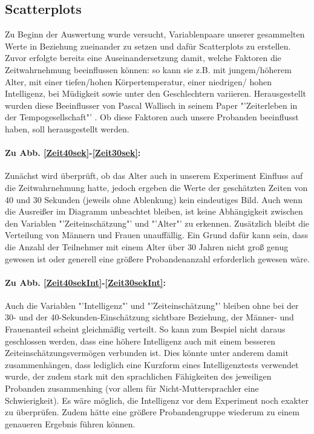\documentclass{Paper}
\begin{document}
\subsection{Scatterplots}
Zu Beginn der Auswertung wurde versucht, Variablenpaare unserer gesammelten Werte in Beziehung zueinander zu setzen und dafür Scatterplots zu erstellen. Zuvor erfolgte bereits eine Auseinandersetzung damit, welche Faktoren die Zeitwahrnehmung beeinflussen können: so kann sie z.B. mit jungem/höherem Alter, mit einer tiefen/hohen Körpertemperatur, einer niedrigen/ hohen Intelligenz, bei Müdigkeit sowie unter den Geschlechtern variieren. Herausgestellt wurden diese Beeinflusser von Pascal Wallisch in seinem Paper "'Zeiterleben in der Tempogesellschaft"' \cite{Wallisch2003}. Ob diese Faktoren auch unsere Probanden beeinflusst haben, soll herausgestellt werden.

\paragraph{Zu Abb. \ref{Zeit40sek}-\ref{Zeit30sek}:}
Zunächst wird überprüft, ob das Alter auch in unserem Experiment Einfluss auf die Zeitwahrnehmung hatte, jedoch ergeben die Werte der geschätzten Zeiten von 40 und 30 Sekunden (jeweils ohne Ablenkung) kein eindeutiges Bild. Auch wenn die Ausreißer im Diagramm unbeachtet bleiben, ist keine Abhängigkeit zwischen den Variablen "'Zeiteinschätzung"' und "'Alter"' zu erkennen. Zusätzlich bleibt die Verteilung von Männern und Frauen unauffällig. Ein Grund dafür kann sein, dass die Anzahl der Teilnehmer mit einem Alter über 30 Jahren nicht groß genug gewesen ist oder generell eine größere Probandenanzahl erforderlich gewesen wäre.

\paragraph{Zu Abb. \ref{Zeit40sekInt}-\ref{Zeit30sekInt}:} Auch die Variablen "'Intelligenz"' und "'Zeiteinschätzung"' bleiben ohne bei der 30- und der 40-Sekunden-Einschätzung sichtbare Beziehung, der Männer- und Frauenanteil scheint gleichmäßig verteilt. So kann zum Bespiel nicht daraus geschlossen werden, dass eine höhere Intelligenz auch mit einem besseren Zeiteinschätzungsvermögen verbunden ist. Dies könnte unter anderem damit zusammenhängen, dass lediglich eine Kurzform eines Intelligenztests verwendet wurde, der zudem stark mit den sprachlichen Fähigkeiten des jeweiligen Probanden zusammenhing (vor allem für Nicht-Muttersprachler eine Schwierigkeit). Es wäre möglich, die Intelligenz vor dem Experiment noch exakter zu überprüfen. Zudem hätte eine größere Probandengruppe wiederum zu einem genaueren Ergebnis führen können.
\end{document}
